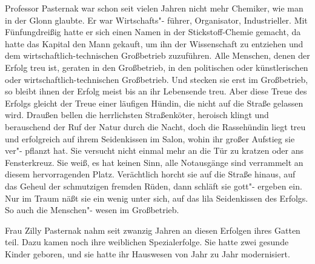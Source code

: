 

Professor Pasternak war schon seit vielen Jahren nicht mehr
Chemiker, wie man in der Glonn glaubte. Er war Wirtschafts"-%
führer, Organisator, Industrieller. Mit Fünfungdreißig hatte
er sich einen Namen in der Stickstoff-Chemie gemacht, da
hatte das Kapital den Mann gekauft, um ihn der Wissenschaft
zu entziehen und dem wirtschaftlich-technischen Großbetrieb
zuzuführen. Alle Menschen, denen der Erfolg treu ist, geraten
in den Großbetrieb, in den politischen oder künstlerischen
oder wirtschaftlich-technischen Großbetrieb. Und stecken sie erst
im Großbetrieb, so bleibt ihnen der Erfolg meist bis an ihr
Lebensende treu. Aber diese Treue des Erfolgs gleicht der
Treue einer läufigen Hündin, die nicht auf die Straße gelassen
wird. Draußen bellen die herrlichsten Straßenköter, heroisch
klingt und berauschend der Ruf der Natur durch die Nacht,
doch die Rassehündin liegt treu und erfolgreich auf ihrem
Seidenkissen im Salon, wohin ihr großer Aufstieg sie ver"-%
pflanzt hat. Sie versucht nicht einmal mehr an die Tür zu
kratzen oder ans Fensterkreuz. Sie weiß, es hat keinen Sinn,
alle Notausgänge sind verrammelt an diesem hervorragenden
Platz. Verächtlich horcht sie auf die Straße hinaus, auf das
Geheul der schmutzigen fremden Rüden, dann schläft sie gott"-%
ergeben ein. Nur im Traum näßt sie ein wenig unter sich,
auf das lila Seidenkissen des Erfolgs. So auch die Menschen"-%
wesen im Großbetrieb.

Frau Zilly Pasternak nahm seit zwanzig Jahren an diesen
Erfolgen ihres Gatten teil. Dazu kamen noch ihre weiblichen
Spezialerfolge. Sie hatte zwei gesunde Kinder geboren,
und sie hatte ihr Hauswesen von Jahr zu Jahr modernisiert.